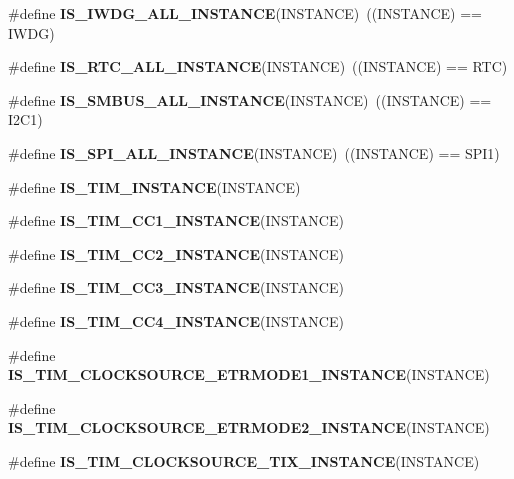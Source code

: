 \begin{DoxyCompactItemize}
\item 
\mbox{\label{group___exported__macro_gad9ec4c52f0572ee67d043e006f1d5e39}} 
\#define {\bfseries I\+S\+\_\+\+I\+W\+D\+G\+\_\+\+A\+L\+L\+\_\+\+I\+N\+S\+T\+A\+N\+CE}(I\+N\+S\+T\+A\+N\+CE)~((I\+N\+S\+T\+A\+N\+CE) == I\+W\+DG)
\item 
\mbox{\label{group___exported__macro_gab4230e8bd4d88adc4250f041d67375ce}} 
\#define {\bfseries I\+S\+\_\+\+R\+T\+C\+\_\+\+A\+L\+L\+\_\+\+I\+N\+S\+T\+A\+N\+CE}(I\+N\+S\+T\+A\+N\+CE)~((I\+N\+S\+T\+A\+N\+CE) == R\+TC)
\item 
\mbox{\label{group___exported__macro_gaf492fcfe71eab8d1dadf4d837b840af6}} 
\#define {\bfseries I\+S\+\_\+\+S\+M\+B\+U\+S\+\_\+\+A\+L\+L\+\_\+\+I\+N\+S\+T\+A\+N\+CE}(I\+N\+S\+T\+A\+N\+CE)~((I\+N\+S\+T\+A\+N\+CE) == I2\+C1)
\item 
\mbox{\label{group___exported__macro_ga59c7619a86c03df3ebeb4bd8aaef982c}} 
\#define {\bfseries I\+S\+\_\+\+S\+P\+I\+\_\+\+A\+L\+L\+\_\+\+I\+N\+S\+T\+A\+N\+CE}(I\+N\+S\+T\+A\+N\+CE)~((I\+N\+S\+T\+A\+N\+CE) == S\+P\+I1)
\item 
\#define {\bfseries I\+S\+\_\+\+T\+I\+M\+\_\+\+I\+N\+S\+T\+A\+N\+CE}(I\+N\+S\+T\+A\+N\+CE)
\item 
\#define {\bfseries I\+S\+\_\+\+T\+I\+M\+\_\+\+C\+C1\+\_\+\+I\+N\+S\+T\+A\+N\+CE}(I\+N\+S\+T\+A\+N\+CE)
\item 
\#define {\bfseries I\+S\+\_\+\+T\+I\+M\+\_\+\+C\+C2\+\_\+\+I\+N\+S\+T\+A\+N\+CE}(I\+N\+S\+T\+A\+N\+CE)
\item 
\#define {\bfseries I\+S\+\_\+\+T\+I\+M\+\_\+\+C\+C3\+\_\+\+I\+N\+S\+T\+A\+N\+CE}(I\+N\+S\+T\+A\+N\+CE)
\item 
\#define {\bfseries I\+S\+\_\+\+T\+I\+M\+\_\+\+C\+C4\+\_\+\+I\+N\+S\+T\+A\+N\+CE}(I\+N\+S\+T\+A\+N\+CE)
\item 
\#define {\bfseries I\+S\+\_\+\+T\+I\+M\+\_\+\+C\+L\+O\+C\+K\+S\+O\+U\+R\+C\+E\+\_\+\+E\+T\+R\+M\+O\+D\+E1\+\_\+\+I\+N\+S\+T\+A\+N\+CE}(I\+N\+S\+T\+A\+N\+CE)
\item 
\#define {\bfseries I\+S\+\_\+\+T\+I\+M\+\_\+\+C\+L\+O\+C\+K\+S\+O\+U\+R\+C\+E\+\_\+\+E\+T\+R\+M\+O\+D\+E2\+\_\+\+I\+N\+S\+T\+A\+N\+CE}(I\+N\+S\+T\+A\+N\+CE)
\item 
\#define {\bfseries I\+S\+\_\+\+T\+I\+M\+\_\+\+C\+L\+O\+C\+K\+S\+O\+U\+R\+C\+E\+\_\+\+T\+I\+X\+\_\+\+I\+N\+S\+T\+A\+N\+CE}(I\+N\+S\+T\+A\+N\+CE)

\end{DoxyCompactItemize}
